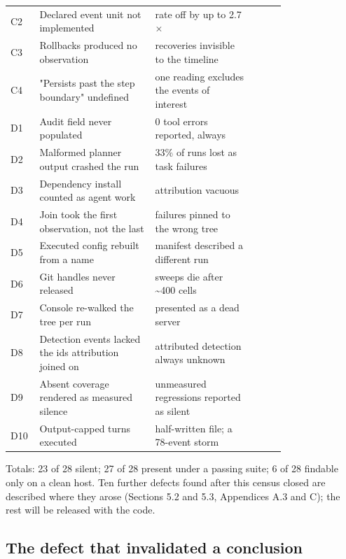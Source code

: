 \documentclass{article}
\newcommand{\cmark}{\ding{51}}
\newcommand{\xmark}{\ding{55}}
\begin{document}
\begin{center}
\begin{tabular}{lp{0.42\linewidth}p{0.36\linewidth}ccc}
C2 & Declared event unit not implemented & rate off by up to 2.7$\times$ & \cmark{} & \cmark{} &  \\
C3 & Rollbacks produced no observation & recoveries invisible to the timeline & \cmark{} & \cmark{} &  \\
C4 & "Persists past the step boundary" undefined & one reading excludes the events of interest & \cmark{} & \cmark{} &  \\
D1 & Audit field never populated & 0 tool errors reported, always & \cmark{} & \cmark{} &  \\
D2 & Malformed planner output crashed the run & 33\% of runs lost as task failures & \xmark{} & \cmark{} &  \\
D3 & Dependency install counted as agent work & attribution vacuous & \cmark{} & \cmark{} &  \\
D4 & Join took the first observation, not the last & failures pinned to the wrong tree & \cmark{} & \cmark{} &  \\
D5 & Executed config rebuilt from a name & manifest described a different run & \cmark{} & \cmark{} &  \\
D6 & Git handles never released & sweeps die after \textasciitilde{}400 cells & \cmark{} & \cmark{} &  \\
D7 & Console re-walked the tree per run & presented as a dead server & \xmark{} & \cmark{} &  \\
D8 & Detection events lacked the ids attribution joined on & attributed detection always unknown & \cmark{} & \cmark{} &  \\
D9 & Absent coverage rendered as measured silence & unmeasured regressions reported as silent & \cmark{} & \cmark{} &  \\
D10 & Output-capped turns executed & half-written file; a 78-event storm & \cmark{} & \cmark{} &  \\
\bottomrule
\end{tabular}\end{center}

Totals: 23 of 28 silent; 27 of 28 present under a passing suite; 6 of 28 findable only on a clean host. Ten further defects found after this census closed are described where they arose (Sections 5.2 and 5.3, Appendices A.3 and C); the rest will be released with the code.

\subsection{The defect that invalidated a conclusion}
\end{document}
